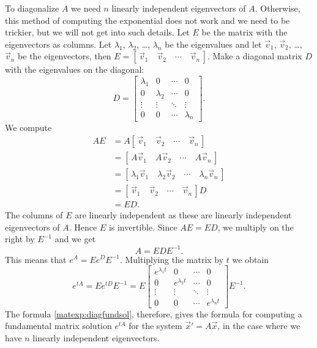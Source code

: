 \documentclass{ximera}
\begin{document}
To diagonalize $A$ we need $n$ linearly independent eigenvectors of $A$. Otherwise, this method of computing the exponential does not work and we need to be trickier, but we will not get into such details. Let $E$ be the matrix with the eigenvectors as columns.  Let $\lambda_1$, $\lambda_2$, \ldots, $\lambda_n$ be the eigenvalues and let $\vec{v}_1$, $\vec{v}_2$, \ldots, $\vec{v}_n$ be the eigenvectors, then $E = [\, \vec{v}_1 \quad \vec{v}_2 \quad \cdots \quad \vec{v}_n \,]$. 
Make a diagonal matrix $D$ with the eigenvalues on the diagonal:
\begin{equation*}
    D =
    \begin{bmatrix}
        \lambda_1 & 0 & \cdots & 0 \\
        0 & \lambda_2 & \cdots & 0 \\
        \vdots & \vdots & \ddots & \vdots \\
        0 & 0 & \cdots & \lambda_n
    \end{bmatrix} .
\end{equation*}
We compute
\begin{equation*}
    \begin{split}
        AE & = A [\, \vec{v}_1 \quad \vec{v}_2 \quad \cdots \quad \vec{v}_n \,] \\
        & = [\, A\vec{v}_1 \quad A\vec{v}_2 \quad \cdots \quad A\vec{v}_n \,] \\
        & = [\, \lambda_1 \vec{v}_1 \quad \lambda_2 \vec{v}_2 \quad \cdots \quad \lambda_n \vec{v}_n \,] \\
        & = [\, \vec{v}_1 \quad \vec{v}_2 \quad \cdots \quad \vec{v}_n \,] D \\
        & = ED .
    \end{split}
\end{equation*}
The columns of $E$ are linearly independent as these are linearly independent eigenvectors of $A$.  Hence $E$ is invertible. Since $AE = ED$, we multiply on the right by $E^{-1}$ and we get
\begin{equation*}
    A = E D E^{-1}.
\end{equation*}
This means that $e^A = E e^D E^{-1}$.  Multiplying the matrix by $t$ we obtain
\begin{equation} \label{matexp:diagfundsol}
    e^{tA} = Ee^{tD}E^{-1} = E
    \begin{bmatrix}
        e^{\lambda_1 t} & 0 & \cdots & 0 \\
        0 & e^{\lambda_2 t} & \cdots & 0 \\
        \vdots & \vdots & \ddots & \vdots \\
        0 & 0 & \cdots & e^{\lambda_n t}
    \end{bmatrix} 
    E^{-1} .
\end{equation}
The formula \eqref{matexp:diagfundsol}, therefore, gives the formula for computing a fundamental matrix solution $e^{tA}$ for the system ${\vec{x}}' = A \vec{x}$, in the case where we have $n$ linearly independent eigenvectors.
\end{document}
